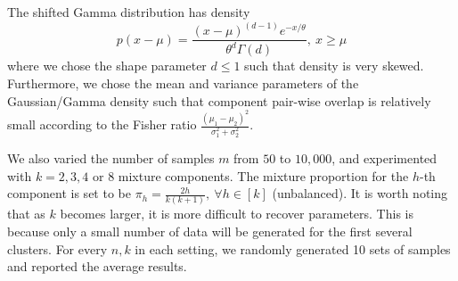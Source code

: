 \documentclass{article}
\begin{document}
The shifted Gamma distribution has density
$$p(x-\mu)=\frac{(x-\mu)^{(d-1)}e^{-x/\theta}}{\theta^d \Gamma(d)},~x\geq \mu$$
where we chose the shape parameter $d\le 1$ such that density is very skewed. Furthermore, we chose the mean and variance parameters of the Gaussian/Gamma density such that component pair-wise overlap is relatively small according to the Fisher ratio $\frac{(\mu_1 - \mu_2)^2}{\sigma_1^2+\sigma_2^2}$.

We also varied the number of samples $m$ from $50$ to $10,000$, and
experimented with $k=2,3,4$ or $8$ mixture components. The mixture proportion for the $h$-th component is set to be $\pi_h= \frac{2h}{k(k+1)},~\forall h\in[k]$ (unbalanced). It is worth noting that as $k$ becomes larger, it is more difficult to recover parameters. This is because only a small number of data will be generated for the first several clusters. For every $n,k$ in each setting, we randomly generated 10 sets of samples and reported the average results.
\end{document}
